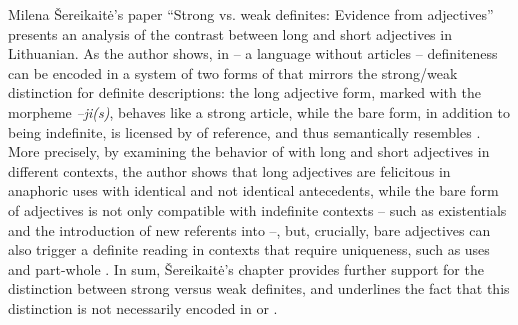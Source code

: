 \documentclass[output=paper]{langsci/langscibook}
\begin{document}
Milena Šereikaitė’s paper “Strong vs. weak definites: Evidence from  adjectives” presents an analysis of the contrast between long and short adjectives in Lithuanian. As the author shows, in  -- a language without articles -- definiteness can be encoded in a system of two forms of  that mirrors the strong/weak distinction for definite descriptions: the long adjective form, marked with the morpheme \textit{–ji(s)}, behaves like a strong article, while the bare form, in addition to being indefinite, is licensed by  of reference, and thus semantically resembles . More precisely, by examining the behavior of  with long and short adjectives in different contexts, the author shows that long adjectives are felicitous in anaphoric uses with identical and not identical antecedents, while the bare form of adjectives is not only compatible with indefinite contexts -- such as existentials and the introduction of new referents into  --, but, crucially, bare adjectives can also trigger a definite reading in contexts that require uniqueness, such as  uses and part-whole . In sum, Šereikaitė’s chapter provides further support for the distinction between strong versus weak definites, and underlines the fact that this distinction is not necessarily encoded in  or . 
\end{document}

